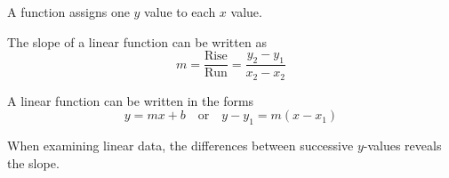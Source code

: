 



\begin{summary}
\item A function assigns one $y$ value to each $x$ value.
\item The slope of a linear function can be written as 
    \[ m = \frac{\text{Rise}}{\text{Run}} = \frac{y_2 - y_1}{x_2 - x_2} \]
\item A linear function can be written in the forms
    \[ y = mx + b \quad \text{or} \quad y-y_1 = m(x-x_1) \]
\item When examining linear data, the differences between successive $y$-values reveals
    the slope.
\end{summary}

\nin \hrulefill








\clearpage

